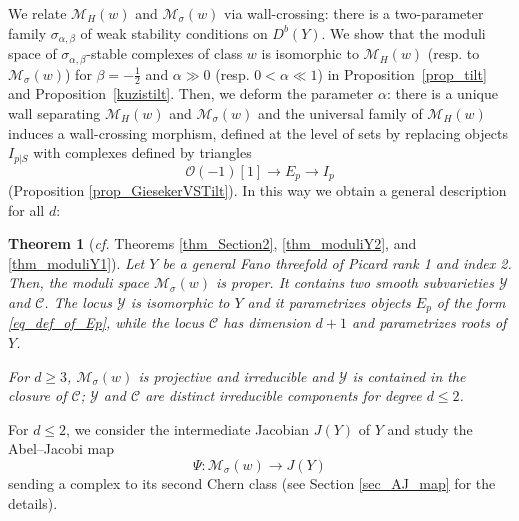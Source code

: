 \documentclass[11pt]{amsart}
\newtheorem{thm}{Theorem}[section]
\theoremstyle{definition}
\newcommand{\Z}{\mathbb{Z}}
\newcommand{\sO}{\mathcal{O}}
\newcommand{\sY}{\mathcal{Y}}
\newcommand{\sM}{\mathcal{M}}
\newcommand{\sC}{\mathcal{C}}
\begin{document}
We relate $\sM_H(w)$ and $\sM_\sigma(w)$ via wall-crossing: there is a two-parameter family $\sigma_{\alpha,\beta}$ of weak stability conditions on $D^b(Y)$. We show that the moduli space of $\sigma_{\alpha,\beta}$-stable complexes of class $w$ is isomorphic to $\sM_H(w)$ (resp. to $\sM_\sigma(w)$) for $\beta=-\frac12$ and $\alpha \gg 0$ (resp. $0< \alpha \ll 1 $) in Proposition~\ref{prop_tilt} and Proposition~\ref{kuzistilt}. %
Then, we deform the parameter $\alpha$: there is a unique wall separating $\sM_H(w)$ and $\sM_\sigma(w)$ and the universal family of $\sM_H(w)$ induces a wall-crossing morphism, defined at the level of sets by replacing objects $I_{p|S}$ %
with complexes defined by triangles 
\begin{equation}\label{eq_def_of_Ep}
\sO(-1)[1] \to E_p \to I_p
\end{equation} (Proposition \ref{prop_GiesekerVSTilt}). In this way we obtain a general description for all $d$:

\begin{thm}[\emph{cf.} Theorems \ref{thm_Section2}, \ref{thm_moduliY2}, and \ref{thm_moduliY1}]\label{introduction_1}
Let $Y$ be a general Fano threefold of Picard rank 1 and index 2. Then, the moduli space $\sM_\sigma(w)$ is proper. It contains two smooth subvarieties $\sY$ and $\sC$. 
The locus $\sY$ is isomorphic to $Y$ and it parametrizes objects $E_p$ of the form \eqref{eq_def_of_Ep}, while the locus $\sC$ has dimension $d+1$ and parametrizes roots of $Y$. 

For $d\geq 3$, $\sM_\sigma(w)$ is projective and irreducible and $\sY$ is contained in the closure of $\sC$; $\sY$ and $\sC$ are distinct irreducible components for degree $d\leq 2$. 
\end{thm}

For $d\leq 2$, we consider the intermediate Jacobian $J(Y)$ of $Y$ and study the Abel--Jacobi map
\[\Psi \colon \mathcal{M}_\sigma(w) \to J(Y)\]
sending a complex to its second Chern class (see Section \ref{sec_AJ_map} for the details). 

\end{document}
